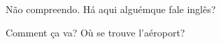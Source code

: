 \documentclass{article}
\begin{document}
N\~{a}o compreendo. H\'{a} aqui algu\'{e}mque fale ingl\^{e}s?

Comment \c{c}a va? O\`{u} se trouve l'a\'{e}roport?
\end{document}
